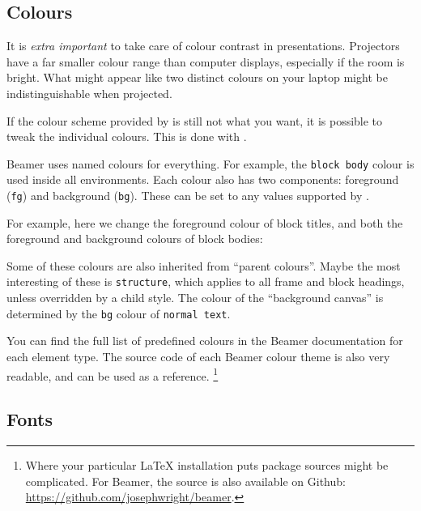 %
%
\subsection{Colours}

\begin{practices}
It is \emph{extra important} to take care of colour contrast in presentations.
Projectors have a far smaller colour range than computer displays,
especially if the room is bright.
What might appear like two distinct colours on your laptop
might be indistinguishable when projected.
\end{practices}

If the colour scheme provided by  is still not what you want,
it is possible to tweak the individual colours.
This is done with .

Beamer uses named colours for everything.
For example, the \verb|block body| colour is used inside all  environments.
Each colour also has two components: foreground (\verb|fg|) and background (\verb|bg|).
These can be set to any values supported by .

For example, here we change the foreground colour of block titles,
and both the foreground and background colours of block bodies:%
\begin{ExampleCode}
\end{ExampleCode}
%
\begin{center}
\end{center}

Some of these colours are also inherited from ``parent colours''.
Maybe the most interesting of these is \verb|structure|,
which applies to all frame and block headings, unless overridden by a child style.
The colour of the ``background canvas'' is determined by the \verb|bg| colour of \verb|normal text|.

You can find the full list of predefined colours in the Beamer documentation for each element type.
The source code of each Beamer colour theme is also very readable,
and can be used as a reference.%
\footnote{Where your particular \LaTeX{} installation puts package sources might be complicated.
For Beamer, the source is also available on Github:
\url{https://github.com/josephwright/beamer}.}



\subsection{Fonts}

